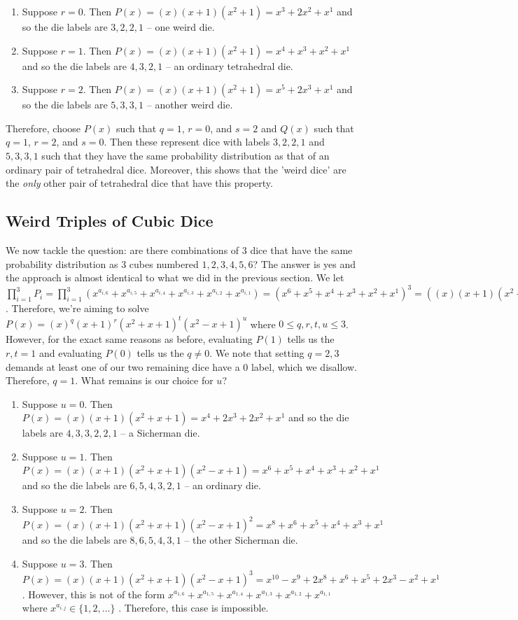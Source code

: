 \documentclass[12pt]{report}
\begin{document}
\begin{enumerate}
\item Suppose $r=0$. Then $P(x)=(x)(x+1)(x^{2}+1)=x^{3}+2x^{2}+x^{1}$ and so the die labels are $3,2,2,1$ -- one weird die.
\item Suppose $r=1$. Then $P(x)=(x)(x+1)(x^{2}+1)=x^{4}+x^{3}+x^{2}+x^{1}$ and so the die labels are $4,3,2,1$ -- an ordinary tetrahedral die.
\item Suppose $r=2$. Then $P(x)=(x)(x+1)(x^{2}+1)=x^{5}+2x^{3}+x^{1}$ and so the die labels are $5,3,3,1$ -- another weird die.
\end{enumerate}

Therefore, choose $P(x)$ such that $q=1$, $r=0$, and $s=2$ and $Q(x)$ such that $q=1$, $r=2$, and $s=0$. Then these represent dice with labels $3,2,2,1$ and $5,3,3,1$ such that they have the same probability distribution as that of an ordinary pair of tetrahedral dice. Moreover, this shows that the 'weird dice' are the \textit{only} other pair of tetrahedral dice that have this property.

\subsection*{Weird Triples of Cubic Dice}
We now tackle the question: are there combinations of 3 dice that have the same probability distribution as 3 cubes numbered $1,2,3,4,5,6$? The answer is yes and the approach is almost identical to what we did in the previous section. We let $\prod_{i=1}^{3} P_{i}=\prod_{i=1}^{3}(x^{a_{i,6}}+x^{a_{i,5}}+x^{a_{i,4}}+x^{a_{i,3}}+x^{a_{i,2}}+x^{a_{i,1}})=(x^{6}+x^{5}+x^{4}+x^{3}+x^{2}+x^{1})^{3}=((x)(x+1)(x^{2}+x+1)(x^{2}-x+1))^{3}$. Therefore, we're aiming to solve $P(x)=(x)^{q}(x+1)^{r}(x^{2}+x+1)^{t}(x^{2}-x+1)^{u}$ where $0\leq q,r,t,u \leq 3$. However, for the exact same reasons as before, evaluating $P(1)$ tells us the $r,t=1$ and evaluating $P(0)$ tells us the $q \neq 0$. We note that setting $q=2,3$ demands at least one of our two remaining dice have a 0 label, which we disallow. Therefore, $q=1$. What remains is our choice for $u$?   

\begin{enumerate}
\item Suppose $u=0$. Then $P(x)=(x)(x+1)(x^{2}+x+1)=x^{4}+2x^{3}+2x^{2}+x^{1}$ and so the die labels are $4,3,3,2,2,1$ -- a Sicherman die.
\item Suppose $u=1$. Then $P(x)=(x)(x+1)(x^{2}+x+1)(x^{2}-x+1)=x^{6}+x^{5}+x^{4}+x^{3}+x^{2}+x^{1}$ and so the die labels are $6,5,4,3,2,1$ -- an ordinary die.
\item Suppose $u=2$. Then $P(x)=(x)(x+1)(x^{2}+x+1)(x^{2}-x+1)^{2}=x^{8}+x^{6}+x^{5}+x^{4}+x^{3}+x^{1}$ and so the die labels are $8,6,5,4,3,1$ -- the other Sicherman die.
\item Suppose $u=3$. Then $P(x)=(x)(x+1)(x^{2}+x+1)(x^{2}-x+1)^{3}=x^{10}-x^{9}+2x^{8}+x^{6}+x^{5}+2x^{3}-x^{2}+x^{1}$. However, this is not of the form $x^{a_{1,6}}+x^{a_{1,5}}+x^{a_{1,4}}+x^{a_{1,3}}+x^{a_{1,2}}+x^{a_{1,1}}$ where $x^{a_{i,j}} \in \{1,2,\ldots\}$ . Therefore, this case is impossible.
\end{enumerate}
\end{document}
